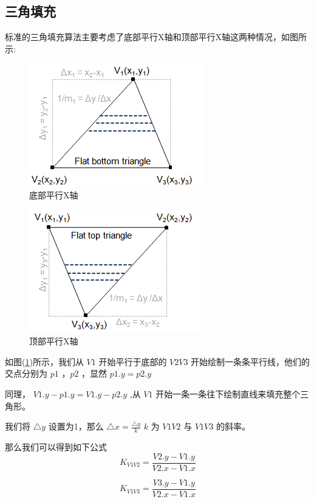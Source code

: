 \documentclass[12pt,oneside,a4paper]{ctexart}
\begin{document}
\subsection{三角填充}
标准的三角填充算法主要考虑了底部平行X轴和顶部平行X轴这两种情况，如图所示:
\begin{figure}[H]
	\centering
	\includegraphics[scale=0.7]{Picture/latex4.1.png}
	\vspace{-2ex}
	\caption{底部平行X轴}
	\label{BottomPTri}
\end{figure}
\begin{figure}[H]
	\centering
	\includegraphics[scale=0.7]{Picture/latex4.2.png}
	\vspace{-2ex}
	\caption{顶部平行X轴}
	\label{TopPTri}
\end{figure}

如图(\ref{BottomPTri})所示，我们从 $V1$ 开始平行于底部的 $V2V3$ 开始绘制一条条平行线，他们的交点分别为 $p1$ ，$p2$ ，显然 $p1.y=p2.y$

同理， $V1.y-p1.y=V1.y-p2.y$ ,从 $V1$ 开始一条一条往下绘制直线来填充整个三角形。

我们将 $\triangle y$ 设置为1，那么 $\triangle x = \frac{\triangle y}{k}$ $k$ 为 $V1V2$ 与 $V1V3$ 的斜率。

那么我们可以得到如下公式
\begin{equation*}
	K_{V1V2} = \frac{V2.y-V1.y}{V2.x-V1.x}
\end{equation*}

\begin{equation*}
	K_{V1V3} = \frac{V3.y-V1.y}{V2.x-V1.x}
\end{equation*}
\end{document}
